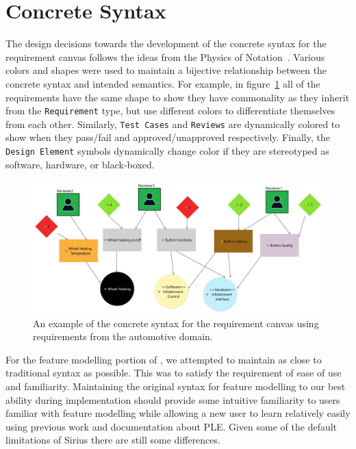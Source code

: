 
\section{Concrete Syntax}
\label{sec:Concrete_Syntax}

The design decisions towards the development of the concrete syntax for the requirement canvas follows the ideas from the Physics of Notation~\cite{5353439}. Various colors and shapes were used to maintain a bijective relationship between the concrete syntax and intended semantics. For example, in figure~\ref{fig:concrete_syntax_req_diag} all of the requirements have the same shape to show they have commonality as they inherit from the \texttt{Requirement} type, but use different colors to differentiate themselves from each other. Similarly, \texttt{Test Cases} and \texttt{Reviews} are dynamically colored to show when they pass/fail and approved/unapproved respectively. Finally, the \texttt{Design Element} symbols dynamically change color if they are stereotyped as software, hardware, or black-boxed.

\begin{figure}[hbt!]
	\centering
	\includegraphics[scale=0.043]{Figures/Requirement Diagram_SteeringWheel.jpg}
	\caption{An example of the concrete syntax for the requirement canvas using requirements from the automotive domain.}
	\label{fig:concrete_syntax_req_diag}
\end{figure}

For the feature modelling portion of \tool, we attempted to maintain as close to traditional syntax as possible. This was to satisfy the requirement of ease of use and familiarity. Maintaining the original syntax for feature modelling to our best ability during implementation should provide some intuitive familiarity to users familiar with feature modelling while allowing a new user to learn relatively easily using previous work and documentation about \ac{PLE}. Given some of the default limitations of Sirius there are still some differences. 

